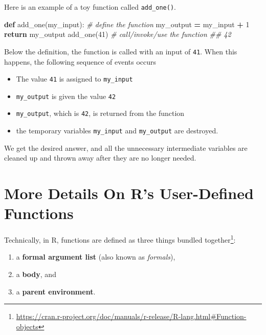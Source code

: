 \documentclass[
  12pt,
  krantz2]{krantz}
\makeatletter
\newenvironment{Shaded}{\begin{snugshade}}{\end{snugshade}}
\newcommand{\CommentTok}[1]{\textcolor[rgb]{0.37,0.37,0.37}{\textit{#1}}}
\newcommand{\ControlFlowTok}[1]{\textcolor[rgb]{0.27,0.27,0.27}{\textbf{#1}}}
\newcommand{\DecValTok}[1]{\textcolor[rgb]{0.06,0.06,0.06}{#1}}
\newcommand{\KeywordTok}[1]{\textcolor[rgb]{0.27,0.27,0.27}{\textbf{#1}}}
\newcommand{\NormalTok}[1]{#1}
\newcommand{\OperatorTok}[1]{\textcolor[rgb]{0.43,0.43,0.43}{\textbf{#1}}}
\providecommand{\tightlist}{%
  \setlength{\itemsep}{0pt}\setlength{\parskip}{0pt}}
\renewcommand{\href}[2]{#2\footnote{\url{#1}}}
\newenvironment{kframe}{%
\medskip{}
\setlength{\fboxsep}{.8em}
 \def\at@end@of@kframe{}%
 \ifinner\ifhmode%
  \def\at@end@of@kframe{\end{minipage}}%
  \begin{minipage}{\columnwidth}%
 \fi\fi%
 \def\FrameCommand##1{\hskip\@totalleftmargin \hskip-\fboxsep
 \colorbox{shadecolor}{##1}\hskip-\fboxsep
     \hskip-\linewidth \hskip-\@totalleftmargin \hskip\columnwidth}%
 \MakeFramed {\advance\hsize-\width
   \@totalleftmargin\z@ \linewidth\hsize
   \@setminipage}}%
 {\par\unskip\endMakeFramed%
 \at@end@of@kframe}
\renewenvironment{Shaded}{\begin{kframe}}{\end{kframe}}
\makeatother
\begin{document}
Here is an example of a toy function called \texttt{add\_one()}.

\begin{Shaded}
\begin{Highlighting}[]
\KeywordTok{def}\NormalTok{ add\_one(my\_input):  }\CommentTok{\# define the function}
\NormalTok{    my\_output }\OperatorTok{=}\NormalTok{ my\_input }\OperatorTok{+} \DecValTok{1}
    \ControlFlowTok{return}\NormalTok{ my\_output}
\NormalTok{add\_one(}\DecValTok{41}\NormalTok{) }\CommentTok{\# call/invoke/use the function }
\CommentTok{\#\# 42}
\end{Highlighting}
\end{Shaded}

Below the definition, the function is called with an input of \texttt{41}. When this happens, the following sequence of events occurs

\begin{itemize}
\tightlist
\item
  The value \texttt{41} is assigned to \texttt{my\_input}
\item
  \texttt{my\_output} is given the value \texttt{42}
\item
  \texttt{my\_output}, which is \texttt{42}, is returned from the function
\item
  the temporary variables \texttt{my\_input} and \texttt{my\_output} are destroyed.
\end{itemize}

We get the desired answer, and all the unnecessary intermediate variables are cleaned up and thrown away after they are no longer needed.

\hypertarget{more-details-on-rs-user-defined-functions}{%
\section{More Details On R's User-Defined Functions}\label{more-details-on-rs-user-defined-functions}}

Technically, in R, functions are \href{https://cran.r-project.org/doc/manuals/r-release/R-lang.html\#Function-objects}{defined as three things bundled together}:

\begin{enumerate}
\def\labelenumi{\arabic{enumi}.}
\tightlist
\item
  a \textbf{formal argument list} (also known as \emph{formals}),
\item
  a \textbf{body}, and
\item
  a \textbf{parent environment}.
\end{enumerate}
\end{document}
